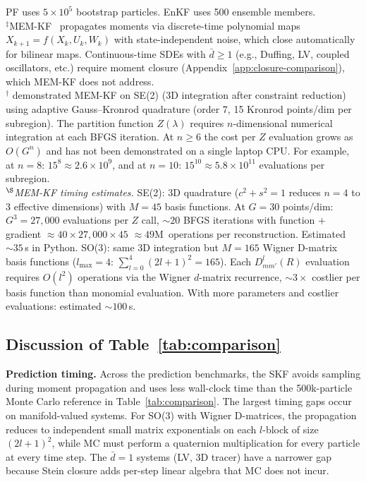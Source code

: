 \documentclass{article}
\theoremstyle{definition}
\begin{document}
\begin{table}[ht]
\vspace{4pt}
{\footnotesize\raggedright PF uses $5{\times}10^5$ bootstrap particles. EnKF uses 500 ensemble members.\\
$^\ddagger$MEM-KF~\cite{teng2025} propagates moments via discrete-time
polynomial maps $X_{k+1} = f(X_k, U_k, W_k)$ with state-independent noise,
which close automatically for bilinear maps.
Continuous-time SDEs with $\bar{d} \ge 1$
(e.g., Duffing, LV, coupled oscillators, etc.) require moment closure
(Appendix~\ref{app:closure-comparison}),
which MEM-KF does not address.\\
$^\dagger$\cite{teng2025} demonstrated MEM-KF on SE(2) (3D integration
after constraint reduction) using adaptive Gauss--Kronrod quadrature
(order 7, 15 Kronrod points/dim per subregion).
The partition function $Z(\lambda)$ requires $n$-dimensional
numerical integration at each BFGS iteration.
At $n{\ge}6$ the cost per $Z$ evaluation grows
as $O(G^n)$ and has not been demonstrated on a single laptop CPU.
For example, at $n{=}8$: $15^8 \approx 2.6 \times 10^9$,
and at $n{=}10$: $15^{10} \approx 5.8 \times 10^{11}$
evaluations per subregion.\\[2pt]
$^\S$\emph{MEM-KF timing estimates.}
SE(2): 3D quadrature ($c^2{+}s^2{=}1$ reduces $n{=}4$ to 3 effective dimensions)
with $M{=}45$ basis functions.
At $G{=}30$ points/dim: $G^3 {=} 27{,}000$ evaluations per $Z$ call,
${\sim}20$ BFGS iterations with function $+$ gradient
${\approx} 40 \times 27{,}000 \times 45$ ${\approx} 49$M~operations per
reconstruction. Estimated ${\sim}35$\,s in Python.
SO(3): same 3D integration but $M{=}165$ Wigner D-matrix basis
functions ($l_{\max}{=}4$: $\sum_{l=0}^{4}(2l{+}1)^2 {=} 165$).
Each $D^l_{mm'}(R)$ evaluation requires $O(l^2)$ operations
via the Wigner $d$-matrix recurrence,
${\sim}3\times$ costlier per basis function than monomial evaluation.
With more parameters and costlier evaluations:
estimated ${\sim}100$\,s.\par}
\end{table}

\subsection{Discussion of Table~\ref{tab:comparison}}

\textbf{Prediction timing.}
Across the prediction benchmarks, the SKF avoids sampling during moment
propagation and uses less wall-clock time than the 500k-particle Monte
Carlo reference in Table~\ref{tab:comparison}.
The largest timing gaps occur on manifold-valued systems.
For SO(3) with Wigner D-matrices, the propagation reduces to independent
small matrix exponentials on each $l$-block of size $(2l{+}1)^2$,
while MC must perform a quaternion multiplication for every particle at
every time step.
The $\bar{d} = 1$ systems (LV, 3D tracer) have a narrower gap because
Stein closure adds per-step linear algebra that MC does not incur.
\end{document}
